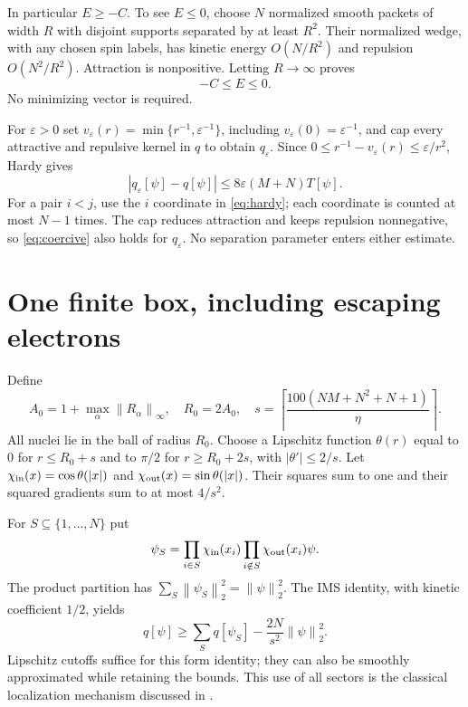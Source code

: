 \documentclass[11pt]{article}
\theoremstyle{remark}\newtheorem{remark}[theorem]{Remark}
\newcommand{\norm}[1]{\left\lVert#1\right\rVert}
\numberwithin{equation}{section}
\begin{document}
In particular $E\geq-C$. To see $E\leq0$, choose $N$ normalized smooth
packets of width $R$ with disjoint supports separated by at least $R^2$.
Their normalized wedge, with any chosen spin labels, has kinetic energy
$O(N/R^2)$ and repulsion $O(N^2/R^2)$. Attraction is nonpositive. Letting
$R\to\infty$ proves
\begin{equation}\label{eq:range}
 -C\leq E\leq0.
\end{equation}
No minimizing vector is required.

For $\varepsilon>0$ set
$v_\varepsilon(r)=\min\{r^{-1},\varepsilon^{-1}\}$, including
$v_\varepsilon(0)=\varepsilon^{-1}$, and cap every attractive and repulsive
kernel in $q$ to obtain $q_\varepsilon$. Since
$0\leq r^{-1}-v_\varepsilon(r)\leq\varepsilon/r^2$, Hardy gives
\begin{equation}\label{eq:capform}
 |q_\varepsilon[\psi]-q[\psi]|
 \leq8\varepsilon(M+N)T[\psi].
\end{equation}
For a pair $i<j$, use the $i$ coordinate in \eqref{eq:hardy}; each coordinate
is counted at most $N-1$ times. The cap reduces attraction and keeps
repulsion nonnegative, so \eqref{eq:coercive} also holds for $q_\varepsilon$.
No separation parameter enters either estimate.

\section{One finite box, including escaping electrons}
\label{sec:box}
Define
\begin{equation}\label{eq:boxchoices}
 A_0=1+\max_\alpha\norm{R_\alpha}_\infty,\quad R_0=2A_0,
 \quad s=\left\lceil\frac{100(NM+N^2+N+1)}\eta\right\rceil.
\end{equation}
All nuclei lie in the ball of radius $R_0$. Choose a Lipschitz function
$\theta(r)$ equal to $0$ for $r\leq R_0+s$ and to $\pi/2$ for
$r\geq R_0+2s$, with $|\theta'|\leq2/s$. Let
$\chi_{\rm in}(x)=\cos\theta(|x|)$ and
$\chi_{\rm out}(x)=\sin\theta(|x|)$. Their squares sum to one and their
squared gradients sum to at most $4/s^2$.

For $S\subseteq\{1,\ldots,N\}$ put
\[
 \psi_S=\prod_{i\in S}\chi_{\rm in}(x_i)
          \prod_{i\notin S}\chi_{\rm out}(x_i)\psi.
\]
The product partition has $\sum_S\norm{\psi_S}_2^2=\norm\psi_2^2$.
The IMS identity, with kinetic coefficient $1/2$, yields
\begin{equation}\label{eq:IMS}
 q[\psi]\geq\sum_S q[\psi_S]-\frac{2N}{s^2}\norm\psi_2^2.
\end{equation}
Lipschitz cutoffs suffice for this form identity; they can also be smoothly
approximated while retaining the bounds. This use of all sectors is the
classical localization mechanism discussed in \cite{lewin}.
\end{document}

